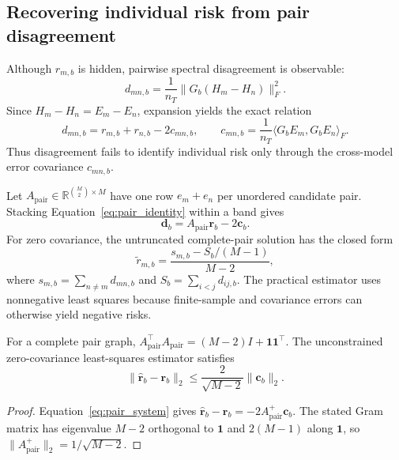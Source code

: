 \subsection{Recovering individual risk from pair disagreement}

Although $r_{m,b}$ is hidden, pairwise spectral disagreement is observable:
\begin{equation}
  d_{mn,b}=\frac{1}{n_T}
  \lVert G_b(H_m-H_n)\rVert_F^2.
  \label{eq:disagreement}
\end{equation}
Since $H_m-H_n=E_m-E_n$, expansion yields the exact relation
\begin{equation}
  d_{mn,b}=r_{m,b}+r_{n,b}-2c_{mn,b},
  \qquad
  c_{mn,b}=\frac{1}{n_T}
  \langle G_bE_m,G_bE_n\rangle_F.
  \label{eq:pair_identity}
\end{equation}
Thus disagreement fails to identify individual risk only through the
cross-model error covariance $c_{mn,b}$.

Let $A_{\mathrm{pair}}\in\mathbb R^{\binom M2\times M}$ have one row
$e_m+e_n$ per unordered candidate pair. Stacking Equation~\eqref{eq:pair_identity}
within a band gives
\begin{equation}
  \mathbf d_b=A_{\mathrm{pair}}\mathbf r_b-2\mathbf c_b.
  \label{eq:pair_system}
\end{equation}
For zero covariance, the untruncated complete-pair solution has the closed
form
\begin{equation}
  \widetilde r_{m,b}
  =\frac{s_{m,b}-S_b/(M-1)}{M-2},
\end{equation}
where $s_{m,b}=\sum_{n\neq m}d_{mn,b}$ and
$S_b=\sum_{i<j}d_{ij,b}$. The practical estimator uses nonnegative least
squares because finite-sample and covariance errors can otherwise yield
negative risks.

\begin{theorem}
For a complete pair graph,
$A_{\mathrm{pair}}^\top A_{\mathrm{pair}}=(M-2)I+\mathbf 1\mathbf 1^\top$.
The unconstrained zero-covariance least-squares estimator satisfies
\begin{equation}
  \lVert\widehat{\mathbf r}_b-\mathbf r_b\rVert_2
  \leq \frac{2}{\sqrt{M-2}}\lVert\mathbf c_b\rVert_2.
  \label{eq:cov_bound}
\end{equation}
\end{theorem}
\begin{proof}
Equation~\eqref{eq:pair_system} gives
$\widehat{\mathbf r}_b-\mathbf r_b=-2A_{\mathrm{pair}}^+\mathbf c_b$.
The stated Gram matrix has eigenvalue $M-2$ orthogonal to $\mathbf 1$ and
$2(M-1)$ along $\mathbf 1$, so
$\lVert A_{\mathrm{pair}}^+\rVert_2=1/\sqrt{M-2}$.
\end{proof}


